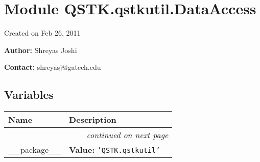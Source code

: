 %
%
%


\section{Module QSTK.qstkutil.DataAccess}

    \label{QSTK:qstkutil:DataAccess}
Created on Feb 26, 2011

\textbf{Author:} Shreyas Joshi



\textbf{Contact:} shreyasj@gatech.edu





  \subsection{Variables}

    \vspace{-1cm}
\hspace{\varindent}\begin{longtable}{|p{\varnamewidth}|p{\vardescrwidth}|l}
\cline{1-2}
\cline{1-2} \centering \textbf{Name} & \centering \textbf{Description}& \\
\cline{1-2}
\endhead\cline{1-2}\multicolumn{3}{r}{\small\textit{continued on next page}}\\\endfoot\cline{1-2}
\endlastfoot\raggedright \_\-\_\-p\-a\-c\-k\-a\-g\-e\-\_\-\_\- & \raggedright \textbf{Value:} 
{\tt \texttt{'}\texttt{QSTK.qstkutil}\texttt{'}}&\\
\cline{1-2}
\end{longtable}



